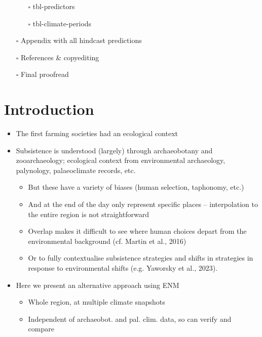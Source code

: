 \documentclass[
  number,
  review]{elsarticle}
\providecommand{\tightlist}{%
  \setlength{\itemsep}{0pt}\setlength{\parskip}{0pt}}\usepackage{longtable,booktabs,array}
\begin{document}
\begin{itemize}
  \begin{itemize}
  \tightlist
  \item[$\square$]
    tbl-predictors
  \item[$\square$]
    tbl-climate-periods
  \end{itemize}
\item[$\square$]
  Appendix with all hindcast predictions
\item[$\square$]
  References \& copyediting
\item[$\square$]
  Final proofread
\end{itemize}

\section{Introduction}\label{introduction}

\begin{itemize}
\tightlist
\item
  The first farming societies had an ecological context
\item
  Subsistence is understood (largely) through archaeobotany and
  zooarchaeology; ecological context from environmental archaeology,
  palynology, palaeoclimate records, etc.

  \begin{itemize}
  \tightlist
  \item
    But these have a variety of biases (human selection, taphonomy,
    etc.)
  \item
    And at the end of the day only represent specific places --
    interpolation to the entire region is not straightforward
  \item
    Overlap makes it difficult to see where human choices depart from
    the environmental background (cf. Martin et al., 2016)
  \item
    Or to fully contextualise subsistence strategies and shifts in
    strategies in response to environmental shifts (e.g. Yaworsky et
    al., 2023).
  \end{itemize}
\item
  Here we present an alternative approach using ENM

  \begin{itemize}
  \tightlist
  \item
    Whole region, at multiple climate snapshots
  \item
    Independent of archaeobot. and pal. clim. data, so can verify and
    compare
  \end{itemize}
\end{itemize}
\end{document}
